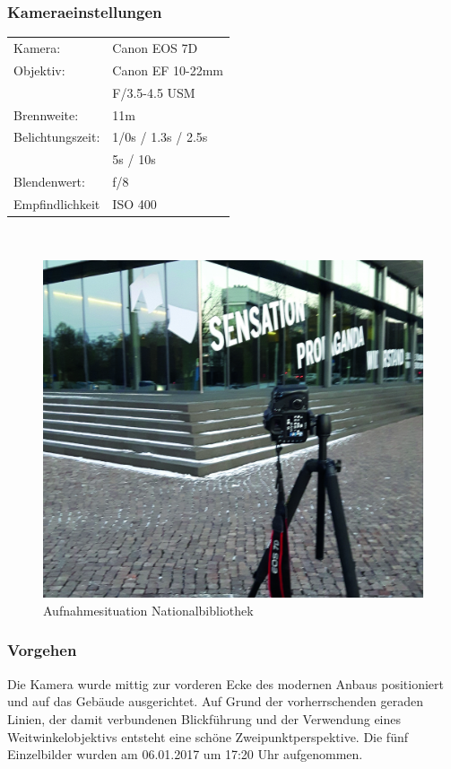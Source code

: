 \documentclass[liststotoc,bibtotoc,fontsize=14pt,]{scrreprt}
\begin{document}
	\subsubsection{Kameraeinstellungen}
	\begin{minipage}{0.58\textwidth}
		\begin{tabular}{ll}
			Kamera: &Canon EOS 7D \\
			Objektiv: &Canon EF 10-22mm \\
			& F/3.5-4.5 USM\\		
			Brennweite:&  11m\\
			Belichtungszeit: & 1/0s / 1.3s / 2.5s\\
			& 5s / 10s\\
			Blendenwert: & f/8\\
			Empfindlichkeit & ISO 400 \\
		\end{tabular}\\
	\end{minipage}%
	\begin{minipage}{0.42\textwidth}
		\begin{figure}[H]
			\includegraphics[width=\linewidth]{img/places/bibo.jpg}
			\caption{Aufnahmesituation Nationalbibliothek}
			\label{img:ak}
		\end{figure}
	\end{minipage}%
			
	\subsubsection{Vorgehen}
	Die Kamera wurde mittig zur vorderen Ecke des modernen Anbaus positioniert und auf das Gebäude ausgerichtet. Auf Grund der vorherrschenden geraden Linien, der damit verbundenen Blickführung und der Verwendung eines Weitwinkelobjektivs entsteht eine schöne Zweipunktperspektive. Die fünf Einzelbilder wurden am 06.01.2017 um 17:20 Uhr aufgenommen.
	
\end{document}
